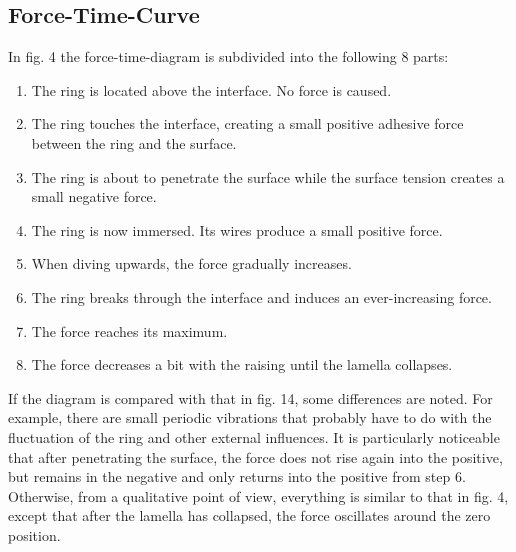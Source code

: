         \subsection*{Force-Time-Curve}\label{sec:A1 force time curve}%
            In fig. 4 the force-time-diagram is subdivided into the following 8 parts:
            \begin{enumerate}
                \item The ring is located above the interface. No force is caused.
                \item The ring touches the interface, creating a small positive adhesive force between the ring and the surface.
                \item The ring is about to penetrate the surface while the surface tension creates a small negative force.
                \item The ring is now immersed. Its wires produce a small positive force.
                \item When diving upwards, the force gradually increases.
                \item The ring breaks through the interface and induces an ever-increasing force.
                \item The force reaches its maximum.
                \item The force decreases a bit with the raising until the lamella collapses.
            \end{enumerate}
            If the diagram is compared with that in fig. 14, some differences are noted. For example, there are small
            periodic vibrations that probably have to do with the fluctuation of the ring and other external influences.
            It is particularly noticeable that after penetrating the surface, the force does not rise again into the
            positive, but remains in the negative and only returns into the positive from step 6. Otherwise, from a
            qualitative point of view, everything is similar to that in fig. 4, except that after the lamella has
            collapsed, the force oscillates around the zero position.
